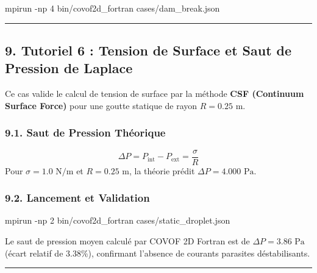 \documentclass[
  french,
]{article}
\newenvironment{Shaded}{}{}
\newcommand{\AttributeTok}[1]{\textcolor[rgb]{0.49,0.56,0.16}{#1}}
\newcommand{\ExtensionTok}[1]{#1}
\newcommand{\NormalTok}[1]{#1}
\begin{document}
\begin{Shaded}
\begin{Highlighting}[]
\ExtensionTok{mpirun} \AttributeTok{{-}np}\NormalTok{ 4 bin/covof2d\_fortran cases/dam\_break.json}
\end{Highlighting}
\end{Shaded}

\begin{center}\rule{0.5\linewidth}{0.5pt}\end{center}

\subsection{9. Tutoriel 6 : Tension de Surface et Saut de Pression de
Laplace}\label{tutoriel-6-tension-de-surface-et-saut-de-pression-de-laplace}

Ce cas valide le calcul de tension de surface par la méthode \textbf{CSF
(Continuum Surface Force)} pour une goutte statique de rayon
\(R = 0.25\text{ m}\).

\subsubsection{9.1. Saut de Pression
Théorique}\label{saut-de-pression-thuxe9orique}

\[\Delta P = P_{\text{int}} - P_{\text{ext}} = \frac{\sigma}{R}\] Pour
\(\sigma = 1.0\text{ N/m}\) et \(R = 0.25\text{ m}\), la théorie prédit
\(\Delta P = 4.000\text{ Pa}\).

\subsubsection{9.2. Lancement et
Validation}\label{lancement-et-validation}

\begin{Shaded}
\begin{Highlighting}[]
\ExtensionTok{mpirun} \AttributeTok{{-}np}\NormalTok{ 2 bin/covof2d\_fortran cases/static\_droplet.json}
\end{Highlighting}
\end{Shaded}

Le saut de pression moyen calculé par COVOF 2D Fortran est de
\(\Delta P = 3.86\text{ Pa}\) (écart relatif de \(3.38\%\)), confirmant
l'absence de courants parasites déstabilisants.

\begin{center}\rule{0.5\linewidth}{0.5pt}\end{center}
\end{document}

